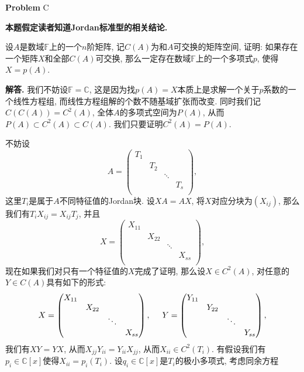 \documentclass{article}
\newcounter{problemname}
\newenvironment{problem}{\begin{shaded}\stepcounter{problemname}\par\noindent\textbf{Problem }}{\end{shaded}\par}
\newenvironment{solution}{\par\noindent\textbf{解答. }}{\par}
\begin{document}
\begin{problem}{C}\par
\textbf{本题假定读者知道Jordan标准型的相关结论.}\par
设$A$是数域$\mathbb{F}$上的一个$n$阶矩阵, 记$C(A)$为和$A$可交换的矩阵空间, 证明: 如果存在一个矩阵$X$和全部$C(A)$可交换, 那么一定存在数域$\mathbb{F}$上的一个多项式$p$, 使得$X=p(A)$.
\end{problem}
\begin{solution}
我们不妨设$\mathbb{F}=\mathbb{C}$, 这是因为找$p(A)=X$本质上是求解一个关于$p$系数的一个线性方程组, 而线性方程组解的个数不随基域扩张而改变. 同时我们记$C(C(A))=C^2(A)$, 全体$A$的多项式空间为$P(A)$, 从而$P(A)\subset C^2(A)\subset C(A)$. 我们只要证明$C^2(A)=P(A)$.\par
不妨设
$$
A=\left( \begin{matrix}
	T_1&		&		&		\\
	&		T_2&		&		\\
	&		&		\ddots&		\\
	&		&		&		T_s\\
\end{matrix} \right) ,
$$
这里$T_i$是属于$A$不同特征值的Jordan块. 设$XA=AX$, 将$X$对应分块为$(X_{ij})$, 那么我们有$T_iX_{ij}=X_{ij}T_j$, 并且
$$
X=\left( \begin{matrix}
	X_{11}&		&		&		\\
	&		X_{22}&		&		\\
	&		&		\ddots&		\\
	&		&		&		X_{ss}\\
\end{matrix} \right) ,
$$
现在如果我们对只有一个特征值的$X$完成了证明, 那么设$X\in C^2(A)$, 对任意的$Y\in C(A)$具有如下的形式: 
$$
X=\left( \begin{matrix}
	X_{11}&		&		&		\\
	&		X_{22}&		&		\\
	&		&		\ddots&		\\
	&		&		&		X_{ss}\\
\end{matrix} \right) ,\hspace{0.5cm}Y=\left( \begin{matrix}
	Y_{11}&		&		&		\\
	&		Y_{22}&		&		\\
	&		&		\ddots&		\\
	&		&		&		Y_{ss}\\
\end{matrix} \right) ,
$$
我们有$XY=YX$, 从而$X_{jj}Y_{ii}=Y_{ii}X_{jj}$, 从而$X_{ii}\in C^2\left( T_i \right) $. 有假设我们有$p_i\in\mathbb{C}[x]$使得$X_{ii}=p_i(T_i)$. 设$q_i\in\mathbb{C}[x]$是$T_i$的极小多项式, 考虑同余方程

\end{solution}
\end{document}
